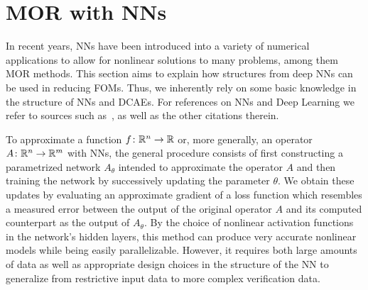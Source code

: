 \section{MOR with \aclp{NN}}\label{sec:nn-mor}

In recent years, \acp{NN} have been introduced into a variety of numerical applications to allow for nonlinear solutions to many problems, among them \ac{MOR} methods.
This section aims to explain how structures from deep \acp{NN} can be used in reducing \acp{FOM}.
Thus, we inherently rely on some basic knowledge in the structure of \acp{NN} and \acp{DCAE}.
For references on \acp{NN} and Deep Learning we refer to sources such as~\cite{Goodfellow2016, Kubat2017, Sarker2021}, as well as the other citations therein.

To approximate a function $f \colon \mathbb{R}^n \to \mathbb{R}$ or, more generally, an operator $A \colon \mathbb{R}^n \to \mathbb{R}^m$ with \acp{NN}, the general procedure consists of first constructing a parametrized network $A_\theta$ intended to approximate the operator $A$ and then training the network by successively updating the parameter $\theta$.
We obtain these updates by evaluating an approximate gradient of a loss function which resembles a measured error between the output of the original operator $A$ and its computed counterpart as the output of $A_\theta$.
By the choice of nonlinear activation functions in the network's hidden layers, this method can produce very accurate nonlinear models while being easily parallelizable.
However, it requires both large amounts of data as well as appropriate design choices in the structure of the \ac{NN} to generalize from restrictive input data to more complex verification data.

